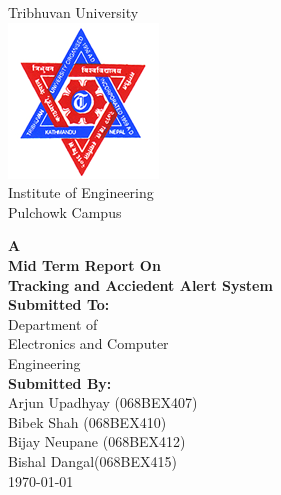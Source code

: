 \documentclass[11pt,a4paper]{article}
\author{Prakash Gautam}
\begin{document}
\begin{titlepage}
	\begin{center}
		\begin{Huge}
			Tribhuvan University\\
			\includegraphics[scale=1.6]{./Images/logo.png}\\
			Institute of Engineering\\
			Pulchowk Campus\\[1.6cm]		
		\end{Huge}
		\textbf{A\\
		Mid Term Report On\\
		Tracking and Acciedent Alert System}\\[1cm]
		\textbf{Submitted To:}\\
		Department of\\
		Electronics and Computer\\Engineering\\[1.6cm]
	
		\textbf{Submitted By:}\\
		Arjun Upadhyay (068BEX407)\\
		Bibek Shah (068BEX410)\\		
		Bijay Neupane (068BEX412)\\
		Bishal Dangal(068BEX415)\\[1.5cm]
		\today	
	\end{center}
\end{titlepage}
\tableofcontents
\newpage
\end{document}

